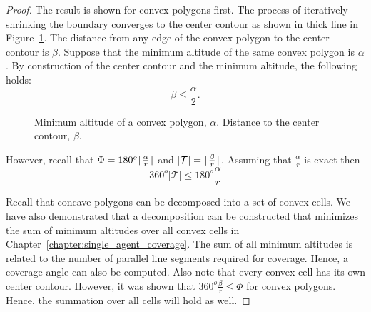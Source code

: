 \documentclass[../main.tex]{subfiles}
\begin{document}
\begin{proof}
The result is shown for convex polygons first. The process of iteratively shrinking the boundary converges to the center contour as shown in thick line in Figure~\ref{fig:skeleton_altitude}. The distance from any edge of the convex polygon to the center contour is $\beta$. Suppose that the minimum altitude of the same convex polygon is $\alpha$. By construction of the center contour and the minimum altitude, the following holds:
\begin{equation}
	\beta\leq\frac{\alpha}{2}.
\end{equation}

\begin{figure}
	\centering
	
	\caption{Minimum altitude of a convex polygon, $\alpha$. Distance to the center contour, $\beta$.}
	\label{fig:skeleton_altitude}
\end{figure}

However, recall that $\Phi=180^o\lceil\frac{\alpha}{r}\rceil$ and $|\mathcal{T}|=\lceil\frac{\beta}{r}\rceil$. Assuming that $\frac{\alpha}{r}$ is exact then
\begin{equation}
	360^o|\mathcal{T}|\leq180^o\frac{\alpha}{r}
\end{equation}

Recall that concave polygons can be decomposed into a set of convex cells. We have also demonstrated that a decomposition can be constructed that minimizes the sum of minimum altitudes over all convex cells in Chapter~\ref{chapter:single_agent_coverage}. The sum of all minimum altitudes is related to the number of parallel line segments required for coverage. Hence, a coverage angle can also be computed. Also note that every convex cell has its own center contour. However, it was shown that $360^o\frac{\beta}{r}\leq\Phi$ for convex polygons. Hence, the summation over all cells will hold as well.
\end{proof}

%		
\end{document}
